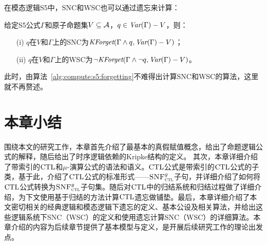 在模态逻辑S5中，SNC和WSC也可以通过遗忘来计算：%
\begin{theorem}\label{thm:S5:SNC}
	给定S5公式$\Gamma$和原子命题集$V\subseteq {\cal A}$，$q\in \textit{Var}(\Gamma) -V$，则：
	\begin{itemize}
		\item[(i)]  $q$在$V$和$\Gamma$上的SNC为$\textit{KForget}(\Gamma \wedge q, \textit{Var}(\Gamma)-V)$；
		\item[(ii)] $q$在$V$和$\Gamma$上的WSC为$\neg \textit{KForget}(\Gamma \wedge \neg q, \textit{Var}(\Gamma)-V)$。
	\end{itemize}
\end{theorem}
此时，由算法~\ref{alg:compute:s5:forgetting}不难得出计算SNC和WSC的算法，这里就不再赘述。


\section{本章小结}
围绕本文的研究工作，本章首先介绍了最基本的真假赋值概念，给出了命题逻辑公式的解释，随后给出了时序逻辑依赖的Kripke结构的定义。
其次，本章详细介绍了带索引的$\textrm{CTL}$和$\mu$-演算公式的语法和语义。$\textrm{CTL}$公式是带索引的$\textrm{CTL}$公式的子类，基于此，介绍了$\textrm{CTL}$公式的标准形式——${\textsc{SNF}_{\textsc{ctl}}^g}$子句，并详细介绍了如何将$\textrm{CTL}$公式转换为${\textsc{SNF}_{\textsc{ctl}}^g}$子句集。随后对$\textrm{CTL}$中的归结系统和归结过程做了详细介绍，为下文使用基于归结的方法计算$\textrm{CTL}$遗忘做铺垫。最后，本章详细介绍了本文密切相关的经典逻辑和模态逻辑下遗忘的定义、基本公设及相关算法，并给出这些逻辑系统下SNC（WSC）的定义和使用遗忘计算SNC（WSC）的详细算法。本章介绍的内容为后续章节提供了基本模型与定义，是开展后续研究工作的理论出发点。

